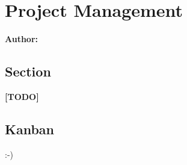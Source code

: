 \chapter{Project Management}

\textbf{Author: } 

\section{Section}
\textbf{[TODO]}
\newline
\lipsum[1]

\section{Kanban}
:-)

\filbreak